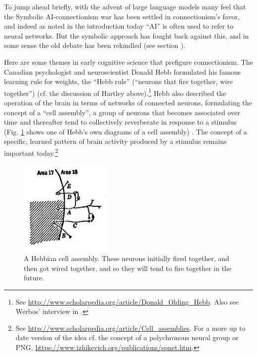 To jump ahead briefly, with the advent of large language models many feel that the Symbolic AI-connectionism war has been settled in connectionism's favor, and indeed  as noted in the introduction today ``AI'' is often used to refer to neural networks. But the symbolic approach has fought back against this, and in some sense the old debate has been rekindled (see section ).

Here are some themes in early cognitive science that prefigure connectionism. The Canadian psychologist and neuroscientist Donald Hebb formulated his famous learning rule for weights, the ``Hebb rule'' (``neurons that fire together, wire together'') \cite{hebb2005organization} (cf. the discussion of Hartley above).\footnote{See \url{http://www.scholarpedia.org/article/Donald_Olding_Hebb}. Also see Werbos' interview in  \cite{anderson2000talking}.}   Hebb also described the operation of the brain in terms of networks of connected neurons, formulating the concept of a ``cell assembly'', a group of neurons that becomes associated over time and thereafter tend to collectively reverberate in response to a stimulus (Fig. \ref{hebb} shows one of Hebb's own diagrams of a cell assembly) \cite{hebb2005organization}. The concept of a specific, learned pattern of brain activity produced by a stimulus remains important today.\footnote{See \url{http://www.scholarpedia.org/article/Cell_assemblies}. For a more up to date version of the idea cf. the concept of a polychronous neural group or PNG, \url{https://www.izhikevich.org/publications/spnet.htm}.}

\begin{figure}[h]
\centering
\includegraphics[width=0.4\textwidth]{./images/HebbCircuit.png}
\caption[From Hebb, 2005 \cite{hebb2005organization}]{A Hebbian cell assembly. These neurons initially fired together, and then got wired together, and so they will tend to fire together in the future.}
\label{hebb}
\end{figure}

